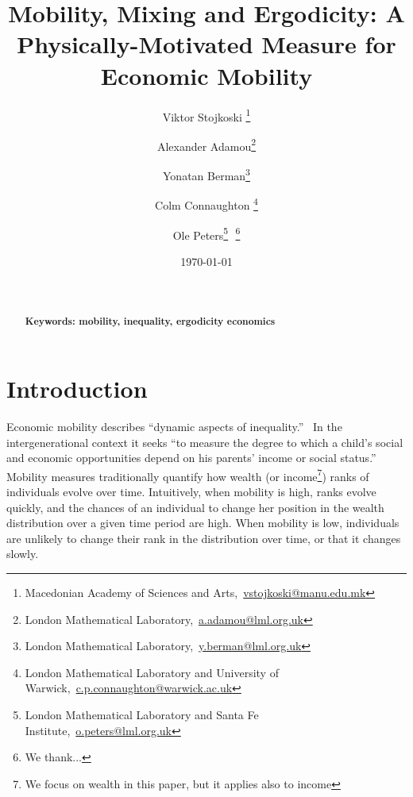 \documentclass[11pt]{article}
\newcommand{\bc}{\begin{center}}
\newcommand{\ec}{\end{center}}
\newcommand{\red}[1]{{\color{red} #1}}
\numberwithin{equation}{section}
\begin{document}
\begin{titlepage}
\title{Mobility, Mixing and Ergodicity: A Physically-Motivated Measure for Economic Mobility}
\author{Viktor Stojkoski \footnote{Macedonian Academy of Sciences and Arts,~\url{vstojkoski@manu.edu.mk}} \and Alexander Adamou\footnote{London Mathematical Laboratory,~\url{a.adamou@lml.org.uk}} \and Yonatan Berman\footnote{London Mathematical Laboratory,~\url{y.berman@lml.org.uk}} \and Colm Connaughton \footnote{London Mathematical Laboratory and University of Warwick,~\url{c.p.connaughton@warwick.ac.uk}} \and Ole Peters\footnote{London Mathematical Laboratory and Santa Fe Institute,~\url{o.peters@lml.org.uk}}\,\, \thanks{We thank...}}
\date{\today}
\maketitle


\begin{abstract}
\noindent 
\\
\\
\noindent\textbf{Keywords: mobility, inequality, ergodicity economics}

\end{abstract}
\setcounter{page}{0}
\thispagestyle{empty}
\end{titlepage}
\pagebreak \newpage

\section{Introduction}\label{sec:introduction}

Economic mobility describes ``dynamic aspects of inequality.''~\citep{Shorrocks1978} In the intergenerational context it seeks ``to measure the degree to which a child's social and economic opportunities depend on his parents' income or social status.''~\citep{chettyETAL2014} Mobility measures traditionally quantify how wealth (or income\footnote{We focus on wealth in this paper, but it applies also to income}) ranks of individuals evolve over time. Intuitively, when mobility is high, ranks evolve quickly, and the chances of an individual to change her position in the wealth distribution over a given time period are high. When mobility is low, individuals are unlikely to change their rank in the distribution over time, or that it changes slowly.
\end{document}
